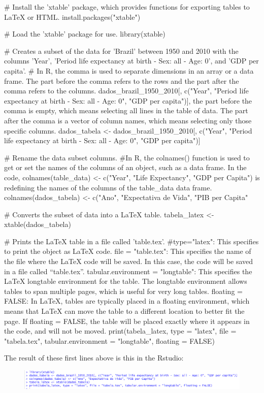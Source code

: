 \documentclass{article}
\begin{document}
\begin{spverbatim}
# Install the 'xtable' package, which provides functions for exporting tables to LaTeX or HTML.
install.packages("xtable")

# Load the 'xtable' package for use.
library(xtable)

# Creates a subset of the data for 'Brazil' between 1950 and 2010 with the columns 'Year', 'Period life expectancy at birth - Sex: all - Age: 0', and 'GDP per capita'.
# In R, the comma is used to separate dimensions in an array or a data frame. The part before the comma refers to the rows and the part after the comma refers to the columns.
dados_brazil_1950_2010[, c("Year", "Period life expectancy at birth - Sex: all - Age: 0", "GDP per capita")], the part before the comma is empty, which means selecting all lines in the table of data. The part after the comma is a vector of column names, which means selecting only those specific columns.
dados_tabela <- dados_brazil_1950_2010[, c("Year", "Period life expectancy at birth - Sex: all - Age: 0", "GDP per capita")]

# Rename the data subset columns.
#In R, the colnames() function is used to get or set the names of the columns of an object, such as a data frame. In the code, colnames(table_data) <- c("Year", "Life Expectancy", "GDP per Capita") is redefining the names of the columns of the table_data data frame.
colnames(dados_tabela) <- c("Ano", "Expectativa de Vida", "PIB per Capita"

# Converts the subset of data into a LaTeX table.
tabela_latex <- xtable(dados_tabela)

# Prints the LaTeX table in a file called 'table.tex'.
#type="latex": This specifies to print the object as LaTeX code.
file = "table.tex": This specifies the name of the file where the LaTeX code will be saved. In this case, the code will be saved in a file called “table.tex”. tabular.environment = "longtable": This specifies the LaTeX longtable environment for the table. The longtable environment allows tables to span multiple pages, which is useful for very long tables. floating = FALSE: In LaTeX, tables are typically placed in a floating environment, which means that LaTeX can move the table to a different location to better fit the page. If floating = FALSE, the table will be placed exactly where it appears in the code, and will not be moved.
print(tabela_latex, type = "latex", file = "tabela.tex", tabular.environment = "longtable", floating = FALSE)
\end{spverbatim}
The result of these first lines above is this in the Rstudio:
\begin{figure}[H]
    \centering
    \includegraphics[width=1\linewidth]{imagesfolder/image19.png}
\end{figure}
\end{document}
